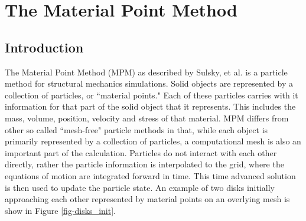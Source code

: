 %
%
%




%

\chapter{The Material Point Method}

  \section{Introduction}

The Material Point Method (MPM) as described by Sulsky, et al.
\cite{sulskycmame,sulskycpc} is a
particle method for structural mechanics simulations.  Solid 
objects
are represented by a collection of particles, or ``material 
points."  Each
of these particles carries with it information for that part of 
the
solid object that it represents.  This includes the mass, 
volume,
position, velocity and stress of that material.  MPM differs 
from other
so called ``mesh-free" particle methods in that, while each 
object is primarily 
represented by a collection of particles, a computational mesh 
is
also an important part of the calculation.  Particles do not 
interact
with each other directly, rather the particle information is 
interpolated
to the grid, where the equations of motion are integrated 
forward in time.
This time advanced solution is then used to update the particle 
state.
An example of two disks initially approaching each other 
represented by
material points on an overlying mesh is show in Figure \ref{fig-disks_init}.

